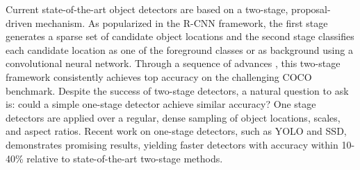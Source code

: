 Current state-of-the-art object detectors are based on
a two-stage, proposal-driven mechanism. As popularized
in the R-CNN framework, the first stage generates a
sparse set of candidate object locations and the second stage
classifies each candidate location as one of the foreground
classes or as background using a convolutional neural network. Through a sequence of advances , this
two-stage framework consistently achieves top accuracy on
the challenging COCO benchmark.
Despite the success of two-stage detectors, a natural
question to ask is: could a simple one-stage detector achieve
similar accuracy? One stage detectors are applied over a
regular, dense sampling of object locations, scales, and aspect ratios. Recent work on one-stage detectors, such as
YOLO and SSD, demonstrates promising
results, yielding faster detectors with accuracy within 10-
40\% relative to state-of-the-art two-stage methods.